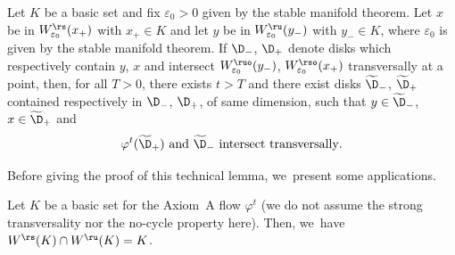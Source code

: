 \begin{appendix}
\begin{lemma}\label{lemma: technical lemma appendix}
Let $K$ be a basic set and fix $\varepsilon_0 > 0$ given by the stable manifold theorem. Let $x$ be in $W_{\varepsilon_0}^\rs (x_+)$ with $x_+ \in K$ and let $y$ be in $W_{\varepsilon_0}^\ru (y_-)$ with $y_- \in K$, where $\varepsilon_0$ is given by the stable manifold theorem. If $\D_-$, $\D_+$ denote disks which respectively contain $y$, $x$ and intersect $W_{\varepsilon_0}^{\ruo} (y_-)$, $W_{\varepsilon_0}^{\rso} (x_+)$ transversally at a point, then, for all $T > 0$, there exists $t > T$ and there exist disks $\widetilde{\D}_-$, $\widetilde{\D}_+$ contained respectively in $\D_-$, $\D_+$, of same dimension, such that $y \in \widetilde{\D}_-$, $x \in \widetilde{\D}_+$ and
\[
\varphi^t (\widetilde{\D}_{+}) \text{ and } \widetilde{\D}_{-} \text{ intersect transversally}.
\]
\end{lemma}

Before giving the proof of this technical lemma, we~present some applications.

\begin{prop}\label{Appendix: prop intersection stable unstable sets of basic sets}
Let $K$ be a basic set for the Axiom~A flow $\varphi^t$ (we do not assume the strong transversality nor the no-cycle property here). Then, we~have $W^\rs (K) \cap\nobreak W^\ru (K) = K$.
\end{prop}


\end{appendix}
